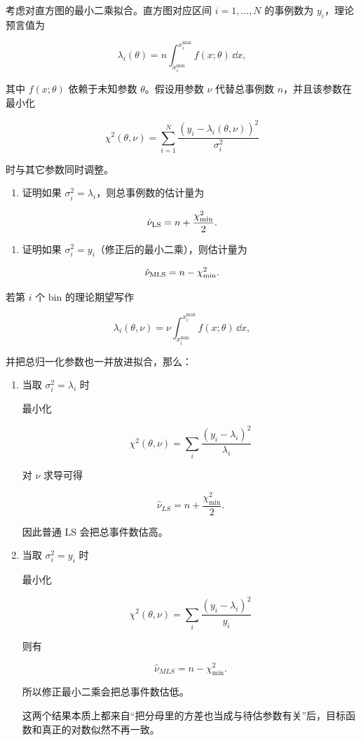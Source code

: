 \begin{question}
考虑对直方图的最小二乘拟合。直方图对应区间 \(i=1,\ldots,N\) 的事例数为
\(y_i\)，理论预言值为

\[
\lambda_i(\theta)=n\int_{x_i^{\min}}^{x_i^{\max}}f(x;\theta)\,\dd{x},
\]

其中 \(f(x;\theta)\) 依赖于未知参数 \(\theta\)。假设用参数 \(\nu\)
代替总事例数 \(n\)，并且该参数在最小化

\[
\chi^2(\theta,\nu)=\sum_{i=1}^{N}\frac{(y_i-\lambda_i(\theta,\nu))^2}{\sigma_i^2}
\]

时与其它参数同时调整。

\begin{enumerate}
\item
  证明如果 \(\sigma_i^2=\lambda_i\)，则总事例数的估计量为
\end{enumerate}

\[
\hat\nu_{\rm LS}=n+\frac{\chi^2_{\min}}{2}.
\]

\begin{enumerate}[start=2]
\item
  证明如果 \(\sigma_i^2=y_i\)（修正后的最小二乘），则估计量为
\end{enumerate}

\[
\hat\nu_{\rm MLS}=n-\chi^2_{\min}.
\]
\begin{solution}
若第 \(i\) 个 bin 的理论期望写作

\[
\lambda_i(\theta,\nu)=\nu\int_{x_i^{\min}}^{x_i^{\max}} f(x;\theta)\,\dd{x},
\]

并把总归一化参数也一并放进拟合，那么：

\begin{enumerate}
\item 当取 \(\sigma_i^2=\lambda_i\) 时

最小化

\[
\chi^2(\theta,\nu)=\sum_i\frac{(y_i-\lambda_i)^2}{\lambda_i}
\]

对 \(\nu\) 求导可得

\[
\hat\nu_{LS}=n+\frac{\chi^2_{\min}}{2}.
\]

因此普通 LS 会把总事件数估高。

\item 当取 \(\sigma_i^2=y_i\) 时

最小化

\[
\chi^2(\theta,\nu)=\sum_i\frac{(y_i-\lambda_i)^2}{y_i}
\]

则有

\[
\hat\nu_{MLS}=n-\chi^2_{\min}.
\]

所以修正最小二乘会把总事件数估低。

这两个结果本质上都来自``把分母里的方差也当成与待估参数有关''后，目标函数和真正的对数似然不再一致。
\end{enumerate}
\end{solution}
\end{question}


